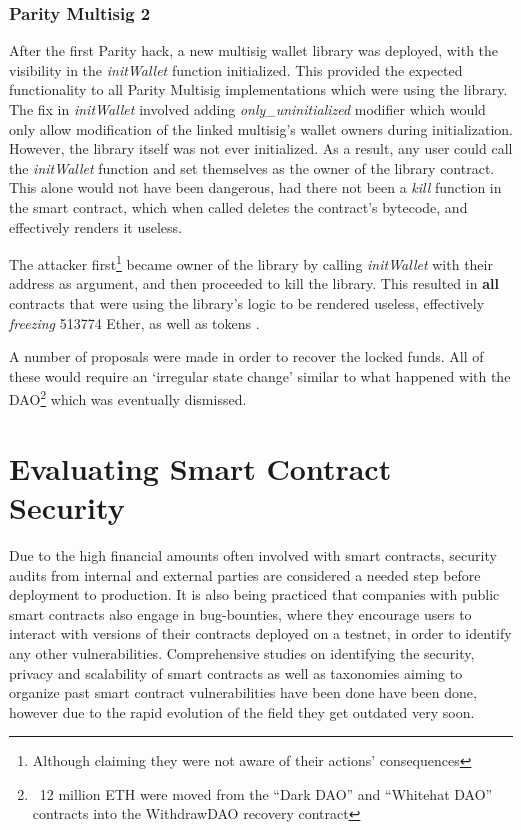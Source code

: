 \subsubsection{Parity Multisig 2}
After the first Parity hack, a new multisig wallet library was deployed, with the visibility in the \textit{initWallet} function initialized. This provided the expected functionality to all Parity Multisig implementations which were using the library. The fix in \textit{initWallet} involved adding \textit{only\_uninitialized} modifier which would only allow modification of the linked multisig's wallet owners during initialization. However, the library itself was not ever initialized. As a result, any user could call the \textit{initWallet} function and set themselves as the owner of the library contract. This alone would not have been dangerous, had there not been a \textit{kill} function in the smart contract, which when called deletes the contract's bytecode, and effectively renders it useless. 

The attacker first\footnote{Although claiming they were not aware of their actions' consequences} became owner of the library by calling \textit{initWallet} with their address as argument, and then proceeded to kill the library. This resulted in \textbf{all} contracts that were using the library's logic to be rendered useless, effectively \textit{freezing} 513774 Ether, as well as tokens \cite{paritypostmortem}. 

A number of proposals were made \cite{eip867} in order to recover the locked funds. All of these would require an `irregular state change' similar to what happened with the DAO\footnote{~12 million ETH were moved from the “Dark DAO” and “Whitehat DAO” contracts into the WithdrawDAO recovery contract\cite{daofork2}} which was eventually dismissed. 

\section{Evaluating Smart Contract Security}
Due to the high financial amounts often involved with smart contracts, security audits from internal and external parties are considered a needed step before deployment to production. It is also being practiced that companies with public smart contracts also engage in bug-bounties, where they encourage users to interact with versions of their contracts deployed on a testnet, in order to identify any other vulnerabilities. Comprehensive studies on identifying the security, privacy and scalability of smart contracts \cite{DBLP:journals/corr/abs-1710-06372} as well as taxonomies aiming to organize past smart contract vulnerabilities have been done \cite{Atzei:2017:SAE:3080353.3080363,tools} have been done, however due to the rapid evolution of the field they get outdated very soon. 


